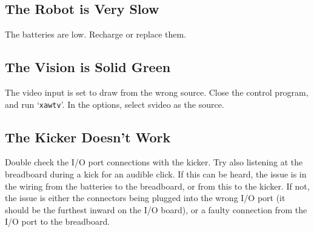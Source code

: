 \documentclass[a4paper,12pt]{scrartcl}
\begin{document}
\subsection{The Robot is Very Slow}

The batteries are low. Recharge or replace them.

\subsection{The Vision is Solid Green}

The video input is set to draw from the wrong source. Close the control
program, and run `\texttt{xawtv}'. In the options, select svideo as the source.

\subsection{The Kicker Doesn't Work}

Double check the I/O port connections with the kicker. Try also listening at
the breadboard during a kick for an audible click. If this can be heard, the
issue is in the wiring from the batteries to the breadboard, or from this to
the kicker. If not, the issue is either the connectors being plugged into the
wrong I/O port (it should be the furthest inward on the I/O board), or a faulty
connection from the I/O port to the breadboard.
\end{document}
